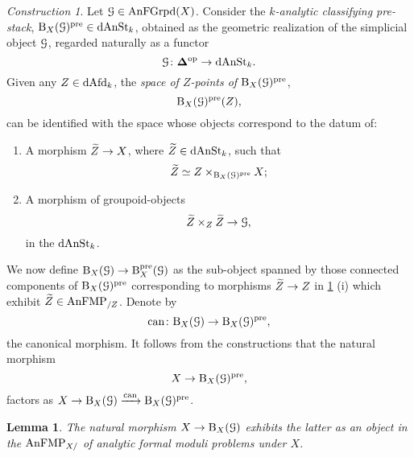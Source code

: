 \documentclass[10pt,a4paper,reqno]{amsart} %
\theoremstyle{plain}
\newtheorem{lem}[thm]{Lemma}
\theoremstyle{definition}
\theoremstyle{remark}
\numberwithin{equation}{section}
\newtheorem{construction}[thm]{Construction}
\begin{document}
\begin{construction} \label{const:formal_classifying_stack_construction}
    Let $\mathcal G \in \mathrm{AnFGrpd}(X)$. Consider the \emph{$k$-analytic classifying pre-stack}, $\mathrm B_X(\mathcal G)^{\mathrm{pre}} \in \mathrm{dAnSt}_k$, obtained as the geometric realization
    of the simplicial object $\mathcal G$, regarded naturally as a functor
        \[
            \mathcal G \colon \bm{\Delta} ^\mathrm{op} \to \mathrm{dAnSt}_k.  
        \]
    Given any $Z \in \mathrm{dAfd}_k$, the \emph{space of $Z$-points of $\mathrm B_X(\mathcal G)^{\mathrm{pre}}$},
        \[
            \mathrm B_X(\mathcal G)^\mathrm{pre}(Z),  
        \]
    can be identified with the space whose objects correspond to the datum of:
        \begin{enumerate}
            \item A morphism $\widetilde Z \to X$, where $\widetilde Z \in \mathrm{dAnSt}_k$, such that
                \[
                    \widetilde Z \simeq Z \times_{\mathrm B_X(\mathcal G)^\mathrm{pre}} X;  
                \]
            \item A morphism of groupoid-objects
                \[\widetilde Z \times_Z \widetilde Z \to \mathcal G,\]
                in the \infcat $\mathrm{dAnSt}_k$.
        \end{enumerate}
    We now define $\mathrm B_X(\mathcal G) \to \mathrm B^\mathrm{pre}_X(\mathcal G)$ as the sub-object spanned by those connected components of $\mathrm B_X(\mathcal G)^\mathrm{pre}$ corresponding to
    morphisms $\widetilde Z \to Z$ in \cref{const:formal_classifying_stack_construction} (i)
    which exhibit $\widetilde Z \in \mathrm{AnFMP}_{/Z}$. Denote by
        \[
            \mathrm{can} \colon \mathrm B_X(\mathcal G) \to \mathrm B_X(\mathcal G)^\mathrm{pre},  
        \]
    the canonical morphism. It follows from the constructions that the natural morphism    
        \[
            X \to \mathrm B_X(\mathcal G)^\mathrm{pre},  
        \]
    factors as $X \to \mathrm B_X(\mathcal G) \xrightarrow{\mathrm{can}} \mathrm B_X(\mathcal G)^\mathrm{pre}$.
\end{construction}

\begin{lem}
    The natural morphism $X \to \mathrm B_X(\mathcal G)$ exhibits the latter as an object in the \infcat $\mathrm{AnFMP}_{X/}$ of analytic formal moduli problems
    under $X$.
\end{lem}
\end{document}
